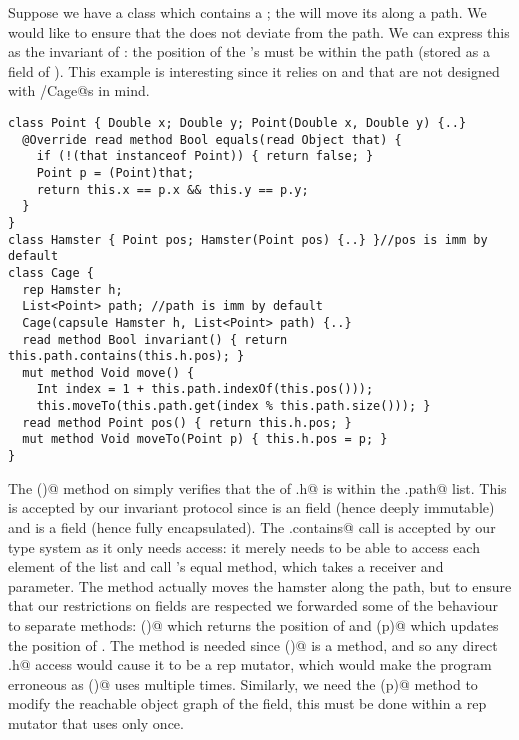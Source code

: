  
Suppose we have a \Q@Cage@ class which contains a \Q@Hamster@; the \Q@Cage@ will move its \Q@Hamster@ along a path. We would like to ensure that the \Q@Hamster@ does not deviate from the path. We can express this as the invariant of \Q@Cage@: the position of the \Q@Cage@'s \Q@Hamster@ must be within the path (stored as a field of \Q@Cage@).
This example is interesting since it relies on \Q@List@s and \Q@Point@s that are not designed with \Q@Hamster/Cage@s in mind.


%
\begin{lstlisting}
class Point { Double x; Double y; Point(Double x, Double y) {..}
  @Override read method Bool equals(read Object that) {
    if (!(that instanceof Point)) { return false; }
    Point p = (Point)that;
    return this.x == p.x && this.y == p.y;
  }
}
class Hamster { Point pos; Hamster(Point pos) {..} }//pos is imm by default
class Cage {
  rep Hamster h;
  List<Point> path; //path is imm by default
  Cage(capsule Hamster h, List<Point> path) {..}
  read method Bool invariant() { return this.path.contains(this.h.pos); }
  mut method Void move() {
    Int index = 1 + this.path.indexOf(this.pos()));
    this.moveTo(this.path.get(index % this.path.size())); }
  read method Point pos() { return this.h.pos; }
  mut method Void moveTo(Point p) { this.h.pos = p; }
}
\end{lstlisting}

The \Q@invariant()@ method on \Q@Cage@ simply verifies that the \Q@pos@ of \Q@this.h@ is within the \Q@this.path@ list. This is accepted by our invariant protocol since \Q@path@ is an \Q@imm@ field (hence deeply immutable) and \Q@h@ is a \Q@rep@ field (hence fully encapsulated). The \Q@path.contains@ call is accepted by our type system as it only needs \Q@read@ access: it merely needs to be able to access each element of the list and call \Q@Point@'s equal method, which takes a \Q@read@ receiver and parameter.
The \Q@move@ method actually moves the hamster along the path, but to ensure that our restrictions on \Q@rep@ fields are respected we forwarded some of the behaviour to separate methods: \Q@pos()@ which returns the position of \Q@h@ and \Q@moveTo(p)@ which updates the position of \Q@h@.
The \Q@pos@ method is needed since \Q@move()@ is a \Q@mut@ method, and so any direct \Q@this.h@ access would cause it to be a rep mutator, which would make the program erroneous as \Q@move()@ uses \Q@this@ multiple times.
Similarly, we need the \Q@moveTo(p)@ method to modify the reachable object graph of the \Q@h@ field, this must be done within a rep mutator that uses \Q@this@ only once.

